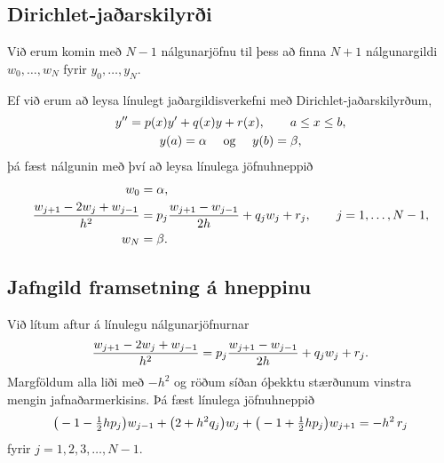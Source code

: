 \documentclass[letterpaper,10pt,icelandic]{sphinxmanual}
\begin{document}
\subsection{Dirichlet-jaðarskilyrði}
\label{kafli07:id2}
Við erum komin með \(N-1\) nálgunarjöfnu til þess að finna
\(N+1\) nálgunargildi \(w_0,\dots,w_N\) fyrir
\(y_0,\dots,y_N\).

Ef við erum að leysa línulegt jaðargildisverkefni með
Dirichlet-jaðarskilyrðum,
\begin{gather}
\begin{split}\begin{gathered}
    y''=p(x)y'+q(x)y+r(x), \qquad a\leq x\leq b,\\
y(a)=\alpha \quad \text{ og } \quad y(b)=\beta,
  \end{gathered}\end{split}\notag
\end{gather}
þá fæst nálgunin með því að leysa línulega jöfnuhneppið
\begin{gather}
\begin{split}\begin{aligned}
w_0&=\alpha,\\
\dfrac{w_{j+1}-2w_j+w_{j-1}}{h^2}
&=p_j\dfrac{w_{j+1}-w_{j-1}}{2h}+q_jw_j+r_j, \qquad j=1,\dots,N-1,\\
w_N&=\beta.  \end{aligned}\end{split}\notag
\end{gather}

\subsection{Jafngild framsetning á hneppinu}
\label{kafli07:jafngild-framsetning-a-hneppinu}
Við lítum aftur á línulegu nálgunarjöfnurnar
\begin{gather}
\begin{split}\dfrac{w_{j+1}-2w_j+w_{j-1}}{h^2}
=p_j\dfrac{w_{j+1}-w_{j-1}}{2h}+q_jw_j+r_j.\end{split}\notag
\end{gather}
Margföldum alla liði með \(-h^2\) og röðum síðan óþekktu stærðunum
vinstra mengin jafnaðarmerkisins. Þá fæst línulega jöfnuhneppið
\begin{gather}
\begin{split}\big(-1-\tfrac 12 h p_j\big)w_{j-1}
+\big(2+h^2q_j\big) w_j
+\big(-1+\tfrac 12 h p_j\big)w_{j+1}
=-h^2\, r_j\end{split}\notag
\end{gather}
fyrir \(j=1,2,3,\dots,N-1\).
\end{document}
